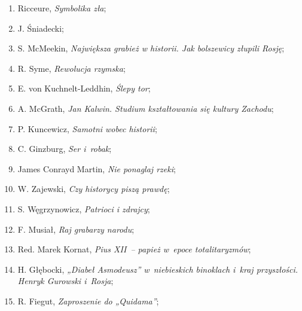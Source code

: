 \documentclass[a4paper,11pt]{article}
\begin{document}
\begin{enumerate}
\item Ricceure, \textit{Symbolika zła};



\item J. Śniadecki;



\item S. McMeekin, \textit{Największa grabież w historii. Jak bolszewicy
    złupili Rosję};



\item R. Syme, \textit{Rewolucja rzymska};



\item E. von Kuchnelt-Leddhin, \textit{Ślepy tor};



\item A. McGrath, \textit{Jan Kalwin. Studium kształtowania się kultury
    Zachodu};



\item P. Kuncewicz, \textit{Samotni wobec historii};



\item C. Ginzburg, \textit{Ser i~robak};



\item James Conrayd Martin, \textit{Nie ponaglaj rzeki};



\item W. Zajewski, \textit{Czy historycy piszą prawdę};



\item S. Węgrzynowicz, \textit{Patrioci i zdrajcy};



\item F. Musiał, \textit{Raj grabarzy narodu};



\item Red. Marek Kornat, \textit{Pius XII~-- papież w~epoce
    totalitaryzmów};



\item H. Głębocki, \textit{„Diabeł Asmodeusz” w~niebieskich binoklach
    i~kraj przyszłości. Henryk Gurowski i~Rosja};



\item R. Fiegut, \textit{Zaproszenie do „Quidama”};




\end{enumerate}
\end{document}
